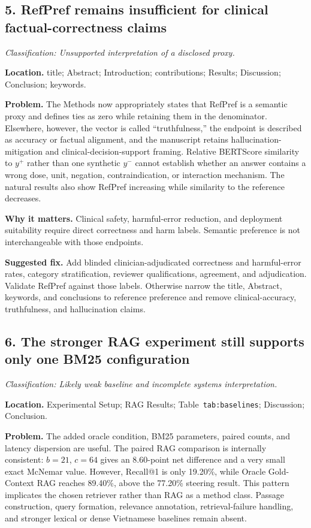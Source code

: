 \documentclass[11pt]{article}
\newcommand{\findinglabel}[1]{\textbf{#1}}
\newcommand{\classification}[1]{\textit{Classification: #1.}}
\begin{document}
\subsection*{5. RefPref remains insufficient for clinical factual-correctness claims}

\classification{Unsupported interpretation of a disclosed proxy}

\findinglabel{Location.} title; Abstract; Introduction; contributions; Results; Discussion; Conclusion; keywords.

\findinglabel{Problem.} The Methods now appropriately states that RefPref is a semantic proxy and defines ties as zero while retaining them in the denominator.  Elsewhere, however, the vector is called ``truthfulness,'' the endpoint is described as accuracy or factual alignment, and the manuscript retains hallucination-mitigation and clinical-decision-support framing.  Relative BERTScore similarity to $y^+$ rather than one synthetic $y^-$ cannot establish whether an answer contains a wrong dose, unit, negation, contraindication, or interaction mechanism.  The natural results also show RefPref increasing while similarity to the reference decreases.

\findinglabel{Why it matters.} Clinical safety, harmful-error reduction, and deployment suitability require direct correctness and harm labels.  Semantic preference is not interchangeable with those endpoints.

\findinglabel{Suggested fix.} Add blinded clinician-adjudicated correctness and harmful-error rates, category stratification, reviewer qualifications, agreement, and adjudication.  Validate RefPref against those labels.  Otherwise narrow the title, Abstract, keywords, and conclusions to reference preference and remove clinical-accuracy, truthfulness, and hallucination claims.

\subsection*{6. The stronger RAG experiment still supports only one BM25 configuration}

\classification{Likely weak baseline and incomplete systems interpretation}

\findinglabel{Location.} Experimental Setup; RAG Results; Table~\texttt{tab:baselines}; Discussion; Conclusion.

\findinglabel{Problem.} The added oracle condition, BM25 parameters, paired counts, and latency dispersion are useful.  The paired RAG comparison is internally consistent: $b=21$, $c=64$ gives an 8.60-point net difference and a very small exact McNemar value.  However, Recall@1 is only 19.20\%, while Oracle Gold-Context RAG reaches 89.40\%, above the 77.20\% steering result.  This pattern implicates the chosen retriever rather than RAG as a method class.  Passage construction, query formation, relevance annotation, retrieval-failure handling, and stronger lexical or dense Vietnamese baselines remain absent.
\end{document}
